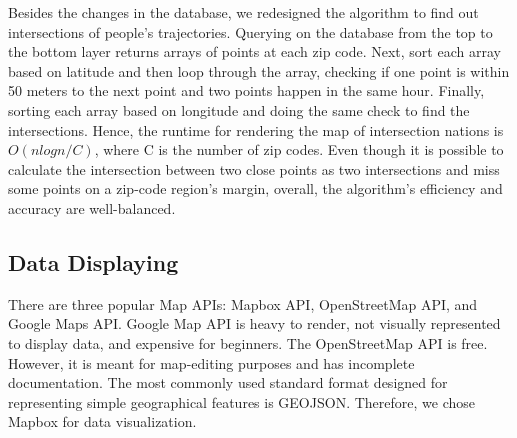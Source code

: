 \documentclass{ucsdreport}
\begin{document}
Besides the changes in the database, we redesigned the algorithm to find out 
intersections of people's trajectories. Querying on the database from the top 
to the bottom layer returns arrays of points at each zip code. Next, sort each
array based on latitude and then loop through the array, checking if one point
is within 50 meters to the next point and two points happen in the same hour. 
Finally, sorting each array based on longitude and doing the same check to find
the intersections. Hence, the runtime for rendering the map of intersection 
nations is $O(nlogn/C)$, where C is the number of zip codes. Even though it is 
possible to calculate the intersection between two close points as two 
intersections and miss some points on a zip-code region's margin, overall, the 
algorithm's efficiency and accuracy are well-balanced. 

\subsection{Data Displaying }
There are three popular Map APIs: Mapbox API, OpenStreetMap API, and
Google Maps API. Google Map API is heavy to render, not visually represented to 
display data, and expensive for beginners. The OpenStreetMap API is free. 
However, it is meant for map-editing purposes and has incomplete documentation.
The most commonly used standard format designed for representing simple 
geographical features is GEOJSON. Therefore, we chose Mapbox for data 
visualization. 

\end{document}

